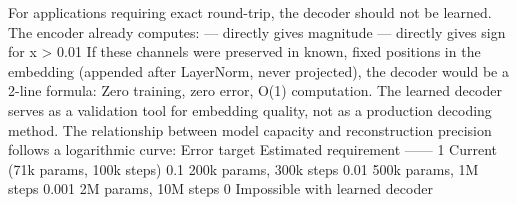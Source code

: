 {}For applications requiring exact round-trip, the decoder should not be learned. The encoder already computes:\markdownRendererInterblockSeparator
{}\markdownRendererUlBeginTight
\markdownRendererUlItem {} — directly gives magnitude\markdownRendererUlItemEnd 
\markdownRendererUlItem {} — directly gives sign for \markdownRendererPipe{}x\markdownRendererPipe{} > 0.01\markdownRendererUlItemEnd 
\markdownRendererUlEndTight \markdownRendererInterblockSeparator
{}If these channels were preserved in known, fixed positions in the embedding (appended after LayerNorm, never projected), the decoder would be a 2-line formula:\markdownRendererInterblockSeparator
{}\markdownRendererInterblockSeparator
{}Zero training, zero error, O(1) computation. The learned decoder serves as a validation tool for embedding quality, not as a production decoding method.\markdownRendererInterblockSeparator
{}
\markdownRendererSectionEnd \markdownRendererSectionBegin
{}\markdownRendererInterblockSeparator
{}The relationship between model capacity and reconstruction precision follows a logarithmic curve:\markdownRendererParagraphSeparator
{}\markdownRendererPipe{} Error target \markdownRendererPipe{} Estimated requirement \markdownRendererPipe{}\markdownRendererSoftLineBreak
{}\markdownRendererPipe{}---\markdownRendererPipe{}---\markdownRendererPipe{}\markdownRendererSoftLineBreak
{}\markdownRendererPipe{} \markdownRendererTilde{}1\markdownRendererPercentSign{} \markdownRendererPipe{} Current (71k params, 100k steps) \markdownRendererPipe{}\markdownRendererSoftLineBreak
{}\markdownRendererPipe{} \markdownRendererTilde{}0.1\markdownRendererPercentSign{} \markdownRendererPipe{} \markdownRendererTilde{}200k params, \markdownRendererTilde{}300k steps \markdownRendererPipe{}\markdownRendererSoftLineBreak
{}\markdownRendererPipe{} \markdownRendererTilde{}0.01\markdownRendererPercentSign{} \markdownRendererPipe{} \markdownRendererTilde{}500k params, \markdownRendererTilde{}1M steps \markdownRendererPipe{}\markdownRendererSoftLineBreak
{}\markdownRendererPipe{} \markdownRendererTilde{}0.001\markdownRendererPercentSign{} \markdownRendererPipe{} \markdownRendererTilde{}2M params, \markdownRendererTilde{}10M steps \markdownRendererPipe{}\markdownRendererSoftLineBreak
{}\markdownRendererPipe{} 0\markdownRendererPercentSign{} \markdownRendererPipe{} Impossible with learned decoder \markdownRendererPipe{}\markdownRendererParagraphSeparator
